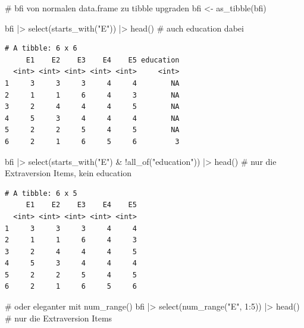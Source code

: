 \documentclass[
  letterpaper,
  DIV=11,
  numbers=noendperiod]{scrreprt}
\newenvironment{Shaded}{\begin{snugshade}}{\end{snugshade}}
\newcommand{\CommentTok}[1]{\textcolor[rgb]{0.37,0.37,0.37}{#1}}
\newcommand{\DecValTok}[1]{\textcolor[rgb]{0.68,0.00,0.00}{#1}}
\newcommand{\FunctionTok}[1]{\textcolor[rgb]{0.28,0.35,0.67}{#1}}
\newcommand{\NormalTok}[1]{\textcolor[rgb]{0.00,0.23,0.31}{#1}}
\newcommand{\OtherTok}[1]{\textcolor[rgb]{0.00,0.23,0.31}{#1}}
\newcommand{\SpecialCharTok}[1]{\textcolor[rgb]{0.37,0.37,0.37}{#1}}
\newcommand{\StringTok}[1]{\textcolor[rgb]{0.13,0.47,0.30}{#1}}
\begin{document}
\begin{Shaded}
\begin{Highlighting}[]
\CommentTok{\# bfi von normalen data.frame zu tibble upgraden}
\NormalTok{bfi }\OtherTok{\textless{}{-}} \FunctionTok{as\_tibble}\NormalTok{(bfi)}

\NormalTok{bfi }\SpecialCharTok{|\textgreater{}} \FunctionTok{select}\NormalTok{(}\FunctionTok{starts\_with}\NormalTok{(}\StringTok{"E"}\NormalTok{)) }\SpecialCharTok{|\textgreater{}} \FunctionTok{head}\NormalTok{() }\CommentTok{\# auch education dabei}
\end{Highlighting}
\end{Shaded}

\begin{verbatim}
# A tibble: 6 x 6
     E1    E2    E3    E4    E5 education
  <int> <int> <int> <int> <int>     <int>
1     3     3     3     4     4        NA
2     1     1     6     4     3        NA
3     2     4     4     4     5        NA
4     5     3     4     4     4        NA
5     2     2     5     4     5        NA
6     2     1     6     5     6         3
\end{verbatim}

\begin{Shaded}
\begin{Highlighting}[]
\NormalTok{bfi }\SpecialCharTok{|\textgreater{}} \FunctionTok{select}\NormalTok{(}\FunctionTok{starts\_with}\NormalTok{(}\StringTok{"E"}\NormalTok{) }\SpecialCharTok{\&} \SpecialCharTok{!}\FunctionTok{all\_of}\NormalTok{(}\StringTok{"education"}\NormalTok{)) }\SpecialCharTok{|\textgreater{}} \FunctionTok{head}\NormalTok{() }\CommentTok{\# nur die Extraversion Items, kein education}
\end{Highlighting}
\end{Shaded}

\begin{verbatim}
# A tibble: 6 x 5
     E1    E2    E3    E4    E5
  <int> <int> <int> <int> <int>
1     3     3     3     4     4
2     1     1     6     4     3
3     2     4     4     4     5
4     5     3     4     4     4
5     2     2     5     4     5
6     2     1     6     5     6
\end{verbatim}

\begin{Shaded}
\begin{Highlighting}[]
\CommentTok{\# oder eleganter mit num\_range()}
\NormalTok{bfi }\SpecialCharTok{|\textgreater{}} \FunctionTok{select}\NormalTok{(}\FunctionTok{num\_range}\NormalTok{(}\StringTok{"E"}\NormalTok{, }\DecValTok{1}\SpecialCharTok{:}\DecValTok{5}\NormalTok{)) }\SpecialCharTok{|\textgreater{}} \FunctionTok{head}\NormalTok{() }\CommentTok{\# nur die Extraversion Items}
\end{Highlighting}
\end{Shaded}
\end{document}
